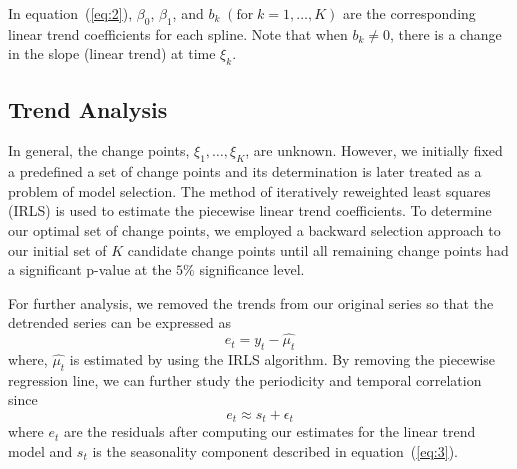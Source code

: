 \documentclass[12pt]{article}
\begin{document}
\noindent
In equation~(\ref{eq:2}), $\beta_0$, $\beta_1$, and $b_k \; (\text{for} \; k=1,\dots,K)$ are the corresponding linear trend coefficients for each spline. Note that when $b_k\neq0$, there is a change in the slope (linear trend) at time $\xi_k$.

\subsection{Trend Analysis}
In general, the change points, $\xi_1,\dots,\xi_K$, are unknown. However, we initially fixed a predefined a set of change points and its determination is later treated as a problem of model selection. The method of iteratively reweighted least squares (IRLS) is used to estimate the piecewise linear trend coefficients. To determine our optimal set of change points, we employed a backward selection approach to our initial set of $K$ candidate change points until all remaining change points had a significant p-value at the $5\%$ significance level.

For further analysis, we removed the trends from our original series so that the detrended series can be expressed as 
$$e_t = y_t - \hat{\mu_t}$$
where, $\hat{\mu_t}$ is estimated by using the IRLS algorithm. By removing the piecewise regression line, we can further study the periodicity and temporal correlation since
$$e_t \approx s_t + \epsilon_t$$
where $e_t$ are the residuals after computing our estimates for the linear trend model and $s_t$ is the seasonality component described in equation~(\ref{eq:3}).
\end{document}
